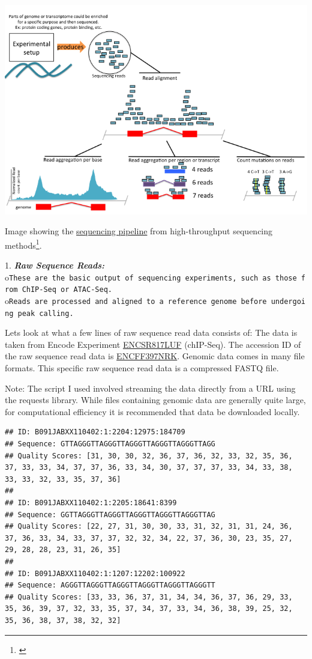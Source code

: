 \documentclass[
]{book}
\begin{document}
\includegraphics{images/sequencing_pipeline.png}

Image showing the \href{https://compgenomr.github.io/book/images/HTseq.png}{sequencing pipeline} from high-throughput sequencing methods\footnote{\citet{akalin2020}}.

1. \textbf{\emph{Raw Sequence Reads:}}
o\texttt{These\ are\ the\ basic\ output\ of\ sequencing\ experiments,\ such\ as\ those\ from\ ChIP-Seq\ or\ ATAC-Seq.}
o\texttt{Reads\ are\ processed\ and\ aligned\ to\ a\ reference\ genome\ before\ undergoing\ peak\ calling.}

Lets look at what a few lines of raw sequence read data consists of:
The data is taken from Encode Experiment \href{https://www.encodeproject.org/experiments/ENCSR817LUF/}{ENCSR817LUF} (chIP-Seq). The accession ID of the raw sequence read data is \href{https://www.encodeproject.org/files/ENCFF397NRK/}{ENCFF397NRK}. Genomic data comes in many file formats. This specific raw sequence read data is a compressed FASTQ file.

Note: The script I used involved streaming the data directly from a URL using the requests library. While files containing genomic data are generally quite large, for computational efficiency it is recommended that data be downloaded locally.

\begin{verbatim}
## ID: B091JABXX110402:1:2204:12975:184709
## Sequence: GTTAGGGTTAGGGTTAGGGTTAGGGTTAGGGTTAGG
## Quality Scores: [31, 30, 30, 32, 36, 37, 36, 32, 33, 32, 35, 36, 37, 33, 33, 34, 37, 37, 36, 33, 34, 30, 37, 37, 37, 33, 34, 33, 38, 33, 33, 32, 33, 35, 37, 36]
## 
## ID: B091JABXX110402:1:2205:18641:8399
## Sequence: GGTTAGGGTTAGGGTTAGGGTTAGGGTTAGGGTTAG
## Quality Scores: [22, 27, 31, 30, 30, 33, 31, 32, 31, 31, 24, 36, 37, 36, 33, 34, 33, 37, 37, 32, 32, 34, 22, 37, 36, 30, 23, 35, 27, 29, 28, 28, 23, 31, 26, 35]
## 
## ID: B091JABXX110402:1:1207:12202:100922
## Sequence: AGGGTTAGGGTTAGGGTTAGGGTTAGGGTTAGGGTT
## Quality Scores: [33, 33, 36, 37, 31, 34, 34, 36, 37, 36, 29, 33, 35, 36, 39, 37, 32, 33, 35, 37, 34, 37, 33, 34, 36, 38, 39, 25, 32, 35, 36, 38, 37, 38, 32, 32]
\end{verbatim}
\end{document}
